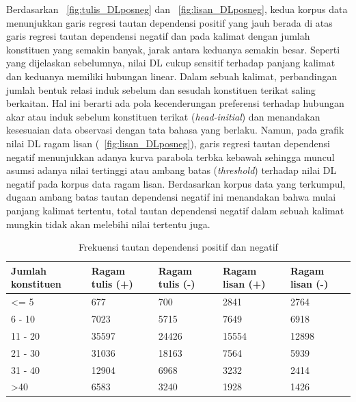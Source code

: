 Berdasarkan \pic~\ref{fig:tulis_DLposneg} dan \pic~\ref{fig:lisan_DLposneg}, kedua korpus data menunjukkan garis regresi tautan dependensi positif yang jauh berada di atas garis regresi tautan dependensi negatif dan pada kalimat dengan jumlah konstituen yang semakin banyak, jarak antara keduanya semakin besar. Seperti yang dijelaskan sebelumnya, nilai DL cukup sensitif terhadap panjang kalimat dan keduanya memiliki hubungan linear. Dalam sebuah kalimat, perbandingan jumlah bentuk relasi induk sebelum dan sesudah konstituen terikat saling berkaitan. Hal ini berarti ada pola kecenderungan preferensi terhadap hubungan akar atau induk sebelum konstituen terikat (\textit{head-initial}) dan menandakan kesesuaian data observasi dengan tata bahasa yang berlaku. Namun, pada grafik nilai DL ragam lisan (\pic~\ref{fig:lisan_DLposneg}), garis regresi tautan dependensi negatif menunjukkan adanya kurva parabola terbka kebawah sehingga muncul asumsi adanya nilai tertinggi atau ambang batas (\textit{threshold}) terhadap nilai DL negatif pada korpus data ragam lisan. Berdasarkan korpus data yang terkumpul, dugaan ambang batas tautan dependensi negatif ini menandakan bahwa mulai panjang kalimat tertentu, total tautan dependensi negatif dalam sebuah kalimat mungkin tidak akan melebihi nilai tertentu juga. 

\begin{table}
\begin{center}
\begin{small}
\caption{Frekuensi tautan dependensi positif dan negatif}  \label{tab:tautanposneg}
\begin{tabular}{ | p{2cm} | p{2cm} | p{2cm} | p{2cm} | p{2cm} |}
    \hline
Jumlah konstituen & Ragam tulis (+) & Ragam tulis (-) & Ragam lisan (+) & Ragam lisan (-) \\ \hline
\textless= 5 & 677 & 700 & 2841 & 2764 \\ \hline
6 - 10 & 7023 & 5715 & 7649 & 6918 \\ \hline
11 - 20 & 35597 & 24426 & 15554 & 12898 \\ \hline
21 - 30 & 31036 & 18163 & 7564 & 5939 \\ \hline
31 - 40 & 12904 & 6968 & 3232 & 2414 \\ \hline
\textgreater 40 & 6583 & 3240 & 1928 & 1426 \\ \hline
   \end{tabular}
   \end{small}
\end{center}
\end{table}

